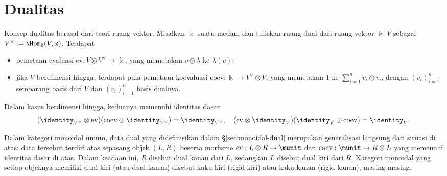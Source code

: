 
\hypertarget{o014.aljabr2.chapter9.duality-a}{ }
\chapter{Dualitas}\label{sec:duality}

Konsep dualitas berasal dari teori ruang vektor. Misalkan $\Bbbk$ suatu medan,
dan tuliskan ruang dual dari ruang vektor-$\Bbbk$ $V$ sebagai
$V^\vee:=\Hom_{\Bbbk}(V,\Bbbk)$. Terdapat
\begin{itemize}
	\item pemetaan evaluasi $\mathrm{ev}:V\otimes V^\vee\to\Bbbk$, yang
	memetakan $v\otimes\lambda$ ke $\lambda(v)$;
	\item jika $V$ berdimensi hingga, terdapat pula pemetaan koevaluasi
	$\mathrm{coev}:\Bbbk\to V^\vee\otimes V$, yang memetakan $1$ ke
	$\sum_{i=1}^n\check{v}_i\otimes v_i$, dengan $(v_i)_{i=1}^n$ sembarang basis
	dari $V$ dan $(\check{v}_i)_{i=1}^n$ basis dualnya.
\end{itemize}

Dalam kasus berdimensi hingga, keduanya memenuhi identitas dasar
\[ (\identity_{V^\vee} \otimes \mathrm{ev})(\mathrm{coev} \otimes \identity_{V^\vee}) = \identity_{V^\vee}, \quad (\mathrm{ev} \otimes \identity_V) (\identity_V \otimes \mathrm{coev}) = \identity_V. \]

Dalam kategori monoidal umum, data dual yang didefinisikan dalam
\S\ref{sec:monoidal-dual} merupakan generalisasi langsung dari situasi di
atas: data tersebut terdiri atas sepasang objek $(L,R)$ beserta morfisme
$\mathrm{ev}:L\otimes R\to\munit$ dan
$\mathrm{coev}:\munit\to R\otimes L$ yang memenuhi identitas dasar di atas.
Dalam keadaan ini, $R$ disebut dual kanan dari $L$, sedangkan $L$ disebut dual
kiri dari $R$. Kategori monoidal yang setiap objeknya memiliki dual kiri
(atau dual kanan) disebut kaku kiri (rigid kiri) atau kaku kanan (rigid
kanan), masing-masing.

